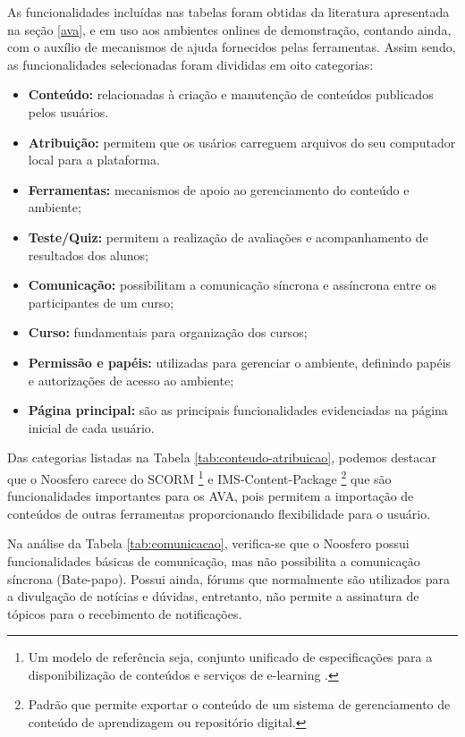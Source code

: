As funcionalidades incluídas nas tabelas foram obtidas da literatura apresentada na seção \ref{ava}, e em uso aos ambientes onlines de demonstração, contando ainda, com o auxílio de mecanismos de ajuda fornecidos pelas ferramentas. Assim sendo, as funcionalidades selecionadas foram divididas em oito categorias:
\begin{itemize}
\item \textbf{Conteúdo:} relacionadas à criação e manutenção de conteúdos publicados pelos usuários.
\item \textbf{Atribuição:} permitem que os usários carreguem arquivos do seu computador local para a plataforma.
\item \textbf{Ferramentas:} mecanismos de apoio ao gerenciamento do conteúdo e ambiente;
\item \textbf{Teste/Quiz:} permitem a realização de avaliações e acompanhamento de resultados dos alunos;
\item \textbf{Comunicação:} possibilitam a comunicação síncrona e assíncrona entre os participantes de um curso;
\item \textbf{Curso:} fundamentais para organização dos cursos;
\item \textbf{Permissão e papéis:} utilizadas para gerenciar o ambiente, definindo papéis e autorizações de acesso ao ambiente;
\item \textbf{Página principal:} são as principais funcionalidades evidenciadas na página inicial de cada usuário.
\end{itemize}

Das categorias listadas na Tabela \ref{tab:conteudo-atribuicao}, podemos destacar que o Noosfero carece do SCORM \footnote{Um modelo de referência seja, conjunto unificado de especificações para a disponibilização de conteúdos e serviços de e-learning \cite{de2006objetos}.} e IMS-Content-Package \footnote{Padrão que permite exportar o conteúdo de um sistema de gerenciamento de conteúdo de aprendizagem ou repositório digital.} que são funcionalidades importantes para os AVA, pois permitem a importação de conteúdos de outras ferramentas proporcionando flexibilidade para o usuário.

Na análise da Tabela \ref{tab:comunicacao}, verifica-se que o Noosfero possui funcionalidades básicas de comunicação, mas não possibilita a comunicação síncrona (Bate-papo). Possui ainda, fórums que normalmente são utilizados para a divulgação de notícias e dúvidas, entretanto, não permite a assinatura de tópicos para o recebimento de notificações.

